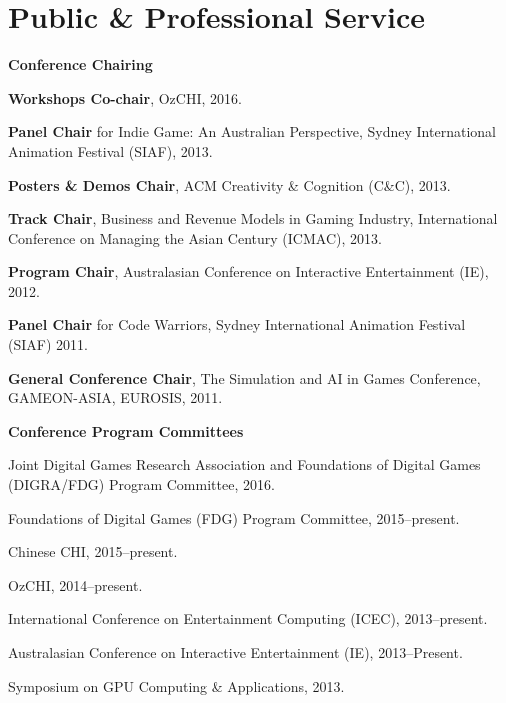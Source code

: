 \documentclass[10pt,a4paper]{article}
\renewenvironment{itemize}{
  \begin{list}{}{
    \setlength{\leftmargin}{1.5em}
    \setlength{\itemsep}{0.25em}
    \setlength{\parskip}{0pt}
    \setlength{\parsep}{0.25em}
  }
}{
  \end{list}
}
\begin{document}
\section*{Public \& Professional Service}

\begin{itemize}

\item \textbf{Conference Chairing}
\begin{itemize}
    \item \textbf{Workshops Co-chair}, OzCHI, 2016.
    \item \textbf{Panel Chair} for Indie Game: An Australian Perspective, Sydney International Animation Festival (SIAF), 2013.
    \item \textbf{Posters \& Demos Chair}, ACM Creativity \& Cognition (C\&C), 2013.
    \item \textbf{Track Chair}, Business and Revenue Models in Gaming Industry, International Conference on Managing the Asian Century (ICMAC), 2013.
    \item \textbf{Program Chair}, Australasian Conference on Interactive Entertainment (IE), 2012.
    \item \textbf{Panel Chair} for Code Warriors, Sydney International Animation Festival (SIAF) 2011.
    \item \textbf{General Conference Chair}, The Simulation and AI in Games Conference, GAMEON-ASIA, EUROSIS, 2011.
\end{itemize}

\item \textbf{Conference Program Committees}
\begin{itemize}
    \item Joint Digital Games Research Association and Foundations of Digital Games (DIGRA/FDG) Program Committee, 2016.
    \item Foundations of Digital Games (FDG) Program Committee, 2015--present.
    \item Chinese CHI, 2015--present.
    \item OzCHI, 2014--present.
    \item International Conference on Entertainment Computing (ICEC), 2013--present.
    \item Australasian Conference on Interactive Entertainment (IE), 2013--Present.
    \item Symposium on GPU Computing \& Applications, 2013.
\end{itemize}


\end{itemize}
\end{document}
